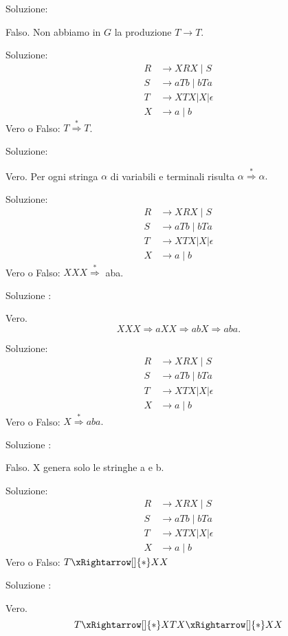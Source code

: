 Soluzione:

Falso. Non abbiamo in $G$ la produzione $T \rightarrow T$.

Soluzione:
$$
\begin{aligned}
R & \rightarrow X R X \mid S \\
S & \rightarrow a T b \mid b T a \\
T & \rightarrow X T X|X| \epsilon \\
X & \rightarrow a \mid b
\end{aligned}
$$
Vero o Falso: $T \stackrel{*}{\Rightarrow} T$.

Soluzione:

Vero. Per ogni stringa $\alpha$ di variabili e terminali risulta $\alpha \stackrel{*}{\Rightarrow} \alpha .$

Soluzione:
$$
\begin{aligned}
R & \rightarrow X R X \mid S \\
S & \rightarrow a T b \mid b T a \\
T & \rightarrow X T X|X| \epsilon \\
X & \rightarrow a \mid b
\end{aligned}
$$
Vero o Falso: $X X X \stackrel{*}{\Rightarrow}$ aba.

Soluzione :

Vero.
$$
X X X \Rightarrow a X X \Rightarrow a b X \Rightarrow a b a .
$$

Soluzione:
$$
\begin{aligned}
R & \rightarrow X R X \mid S \\
S & \rightarrow a T b \mid b T a \\
T & \rightarrow X T X|X| \epsilon \\
X & \rightarrow a \mid b
\end{aligned}
$$
Vero o Falso: $X \stackrel{*}{\Rightarrow} a b a .$

Soluzione :

Falso. X genera solo le stringhe a e b.

Soluzione:
$$
\begin{aligned}
R & \rightarrow X R X \mid S \\
S & \rightarrow a T b \mid b T a \\
T & \rightarrow X T X|X| \epsilon \\
X & \rightarrow a \mid b
\end{aligned}
$$
Vero o Falso: $T \xRightarrow[]{*} X X$

Soluzione :

Vero.
$$
T \xRightarrow[]{*} X T X \xRightarrow[]{*} X X
$$

